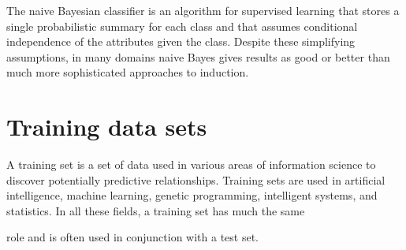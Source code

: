 \documentclass[11pt]{article} %
\begin{document}
The naive Bayesian classifier is an algorithm for supervised learning that stores a single probabilistic summary for each class and that assumes conditional independence of the attributes given the class. Despite these simplifying assumptions, in many domains naive Bayes gives results as good or better than much more sophisticated approaches to induction. 




\section{Training data sets}

A training set is a set of data used in various areas of information science to discover potentially predictive relationships. Training sets are used in artificial intelligence, machine learning, genetic programming, intelligent systems, and statistics. In all these fields, a training set has much the same 

role and is often used in conjunction with a test set.
\end{document}
